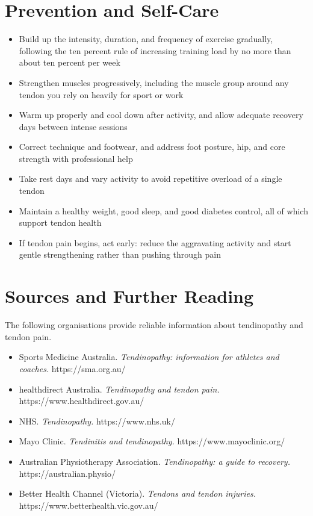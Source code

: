 \section*{Prevention and Self-Care}
\begin{itemize}
    \item Build up the intensity, duration, and frequency of exercise gradually, following the ten percent rule of increasing training load by no more than about ten percent per week
    \item Strengthen muscles progressively, including the muscle group around any tendon you rely on heavily for sport or work
    \item Warm up properly and cool down after activity, and allow adequate recovery days between intense sessions
    \item Correct technique and footwear, and address foot posture, hip, and core strength with professional help
    \item Take rest days and vary activity to avoid repetitive overload of a single tendon
    \item Maintain a healthy weight, good sleep, and good diabetes control, all of which support tendon health
    \item If tendon pain begins, act early: reduce the aggravating activity and start gentle strengthening rather than pushing through pain
\end{itemize}

\section*{Sources and Further Reading}
The following organisations provide reliable information about tendinopathy and tendon pain.

\begin{itemize}
    \item Sports Medicine Australia. \textit{Tendinopathy: information for athletes and coaches.} https://sma.org.au/
    \item healthdirect Australia. \textit{Tendinopathy and tendon pain.} https://www.healthdirect.gov.au/
    \item NHS. \textit{Tendinopathy.} https://www.nhs.uk/
    \item Mayo Clinic. \textit{Tendinitis and tendinopathy.} https://www.mayoclinic.org/
    \item Australian Physiotherapy Association. \textit{Tendinopathy: a guide to recovery.} https://australian.physio/
    \item Better Health Channel (Victoria). \textit{Tendons and tendon injuries.} https://www.betterhealth.vic.gov.au/
\end{itemize}

\clearpage
